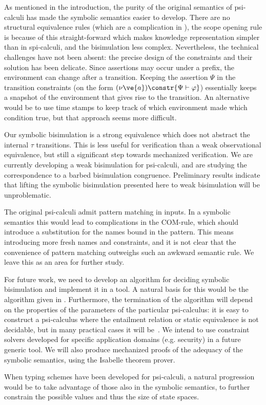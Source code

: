 \documentclass{eptcs}
\theoremstyle{definition}
\begin{document}
As mentioned in the introduction, the purity of the original semantics
of psi-calculi has made the symbolic semantics easier to develop.
There are no structural equivalence rules (which are a complication in
\api), the scope opening rule is because of this straight-forward
which makes knowledge representation simpler than in spi-calculi, and
the bisimulation less complex.
Nevertheless, the technical challenges have not been absent: the
precise design of the constraints and their solution has been
delicate.  Since assertions may occur under a prefix, the environment can
change after a transition. Keeping the assertion $\Psi$ in the
transition constraints
(on the form $(\nu \ve{a})\constr{\Psi \vdash \varphi}$) essentially keeps
a snapshot of the environment that gives rise to the transition. An
alternative would be to use time stamps to keep track of which environment
made which condition true, but that approach seems more difficult.

Our symbolic bisimulation is a strong equivalence which does not
abstract the internal $\tau$ transitions. This is less useful for
verification than a weak observational equivalence, but still a
significant step towards mechanized verification.
We are currently developing a weak bisimulation for psi-calculi, and
are studying the correspondence to a barbed bisimulation congruence.
Preliminary results indicate that lifting the symbolic bisimulation
presented here to weak bisimulation will be unproblematic.


The original psi-calculi admit pattern matching in inputs. 
In a symbolic semantics this would lead to complications in the \textsc{COM}-rule,
which should introduce a substitution
for the names bound in the pattern. This means introducing
more fresh names and constraints, and it is not clear that the
convenience of pattern matching outweighs such an awkward semantic
rule. We leave this as an area for further study.

For future work, we need to develop an algorithm for deciding symbolic
bisimulation and implement it in a tool. A natural basis for this
would be the algorithm given in
\cite{hennessy.lin:symbolic-bisimulations}.
Furthermore, the termination of the algorithm will depend
on the properties of the parameters of the particular psi-calculus: it
is easy to construct a psi-calculus where the entailment relation or
static equivalence is
not decidable, but in many practical cases it will be~\cite{borgstroem:equivalences-calculi,baudet:thesis}.  
We intend to use constraint solvers developed for specific application
domains (e.g. security) in a future generic tool. We will also produce mechanized proofs of the adequacy of the symbolic
semantics, using the Isabelle theorem prover.


When typing schemes have been developed for psi-calculi,
a natural progression would be to take advantage of those also in the
symbolic semantics, to further constrain the possible values and thus the
size of state spaces.



\end{document}
